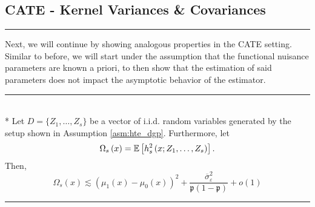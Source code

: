 \subsection{CATE - Kernel Variances \& Covariances}
\hrule
Next, we will continue by showing analogous properties in the CATE setting.
Similar to before, we will start under the assumption that the functional nuisance parameters are known a priori, to then show that the estimation of said parameters does not impact the asymptotic behavior of the estimator.
\vspace{0.5cm}
\hrule

\begin{lem}\label{lem:CATE_omega_s}\mbox{}\\*
	Let $D = \{Z_1, \dotsc, Z_{s}\}$ be a vector of i.i.d. random variables generated by the setup shown in Assumption \ref{asm:hte_dgp}.
	Furthermore, let
	\begin{equation}
		\Omega_{s}\left(x\right)
		= \mathbb{E}\left[h_{s}^{2}\left(x; Z_1, \ldots,  Z_{s}\right)\right].
	\end{equation}
	Then,
	\begin{equation}
		\Omega_{s}\left(x\right)
		\lesssim \left(\mu_{1}\left(x\right) - \mu_{0}\left(x\right)\right)^2 + \frac{\overline{\sigma}^2_{\varepsilon}}{\mathfrak{p}\left(1 - \mathfrak{p}\right)} + o(1)
	\end{equation}
\end{lem}
\hrule
